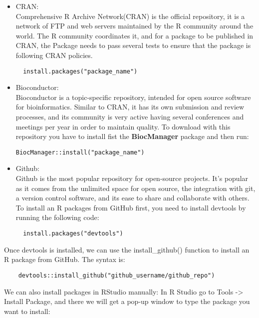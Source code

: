\documentclass[
]{book}
\begin{document}
\begin{itemize}
\item
  CRAN:\\
  Comprehensive R Archive Network(CRAN) is the official repository, it is a network of FTP and web servers maintained by the R community around the world. The R community coordinates it, and for a package to be published in CRAN, the Package needs to pass several tests to ensure that the package is following CRAN policies.

\begin{verbatim}
  install.packages("package_name")
\end{verbatim}
\item
  Bioconductor:\\
  Bioconductor is a topic-specific repository, intended for open source software for bioinformatics. Similar to CRAN, it has its own submission and review processes, and its community is very active having several conferences and meetings per year in order to maintain quality.
  To download with this repository you have to install fist the \textbf{BiocManager} package and then run:

\begin{verbatim}
BiocManager::install("package_name")
\end{verbatim}
\item
  Github:\\
  Github is the most popular repository for open-source projects. It's popular as it comes from the unlimited space for open source, the integration with git, a version control software, and its ease to share and collaborate with others.
  To install an R packages from GitHub first, you need to install devtools by running the following code:

\begin{verbatim}
  install.packages("devtools")
\end{verbatim}
\end{itemize}

Once devtools is installed, we can use the install\_github() function to install an R package from GitHub. The syntax is:

\begin{verbatim}
    devtools::install_github("github_username/github_repo")
\end{verbatim}

We can also install packages in RStudio manually:
In R Studio go to Tools -\textgreater{} Install Package, and there we will get a pop-up window to type the package you want to install:
\end{document}
